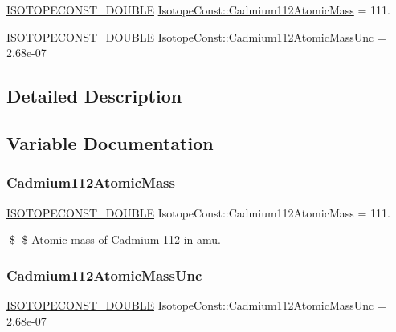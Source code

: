 \begin{DoxyCompactItemize}
\item 
\mbox{\hyperlink{group___isotope_const-_macros_ga8f45a7272ce02c0b4c65c44636ed719a}{I\+S\+O\+T\+O\+P\+E\+C\+O\+N\+S\+T\+\_\+\+D\+O\+U\+B\+LE}} \mbox{\hyperlink{group___isotope_const-_cadmium-_cd112_ga6aac2d36decadc55334fd5268128765b}{Isotope\+Const\+::\+Cadmium112\+Atomic\+Mass}} = 111.
\item 
\mbox{\hyperlink{group___isotope_const-_macros_ga8f45a7272ce02c0b4c65c44636ed719a}{I\+S\+O\+T\+O\+P\+E\+C\+O\+N\+S\+T\+\_\+\+D\+O\+U\+B\+LE}} \mbox{\hyperlink{group___isotope_const-_cadmium-_cd112_gaeb526743f2b29593677c2b6f74d3a585}{Isotope\+Const\+::\+Cadmium112\+Atomic\+Mass\+Unc}} = 2.\+68e-\/07
\end{DoxyCompactItemize}


\subsection{Detailed Description}


\subsection{Variable Documentation}
\mbox{\label{group___isotope_const-_cadmium-_cd112_ga6aac2d36decadc55334fd5268128765b}} 
\subsubsection{\texorpdfstring{Cadmium112\+Atomic\+Mass}{Cadmium112AtomicMass}}
{\footnotesize\ttfamily \mbox{\hyperlink{group___isotope_const-_macros_ga8f45a7272ce02c0b4c65c44636ed719a}{I\+S\+O\+T\+O\+P\+E\+C\+O\+N\+S\+T\+\_\+\+D\+O\+U\+B\+LE}} Isotope\+Const\+::\+Cadmium112\+Atomic\+Mass = 111.}

\$ \$ Atomic mass of Cadmium-\/112 in amu. \mbox{\label{group___isotope_const-_cadmium-_cd112_gaeb526743f2b29593677c2b6f74d3a585}} 
\subsubsection{\texorpdfstring{Cadmium112\+Atomic\+Mass\+Unc}{Cadmium112AtomicMassUnc}}
{\footnotesize\ttfamily \mbox{\hyperlink{group___isotope_const-_macros_ga8f45a7272ce02c0b4c65c44636ed719a}{I\+S\+O\+T\+O\+P\+E\+C\+O\+N\+S\+T\+\_\+\+D\+O\+U\+B\+LE}} Isotope\+Const\+::\+Cadmium112\+Atomic\+Mass\+Unc = 2.\+68e-\/07}

